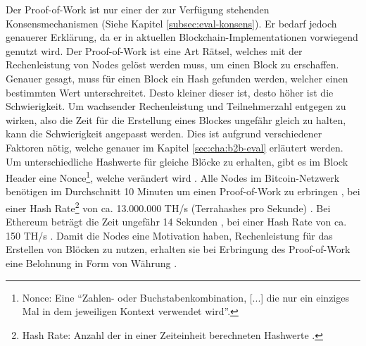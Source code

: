 Der Proof-of-Work ist nur einer der zur Verfügung stehenden Konsensmechanismen (Siehe Kapitel \ref{subsec:eval-konsens}). Er bedarf jedoch genauerer Erklärung, da er in aktuellen Blockchain-Implementationen vorwiegend genutzt wird. Der Proof-of-Work ist eine Art Rätsel, welches mit der Rechenleistung von Nodes gelöst werden muss, um einen Block zu erschaffen. Genauer gesagt, muss für einen Block ein Hash gefunden werden, welcher einen bestimmten Wert unterschreitet. Desto kleiner dieser ist, desto höher ist die Schwierigkeit. Um wachsender Rechenleistung und Teilnehmerzahl entgegen zu wirken, also die Zeit für die Erstellung eines Blockes ungefähr gleich zu halten, kann die Schwierigkeit angepasst werden. Dies ist aufgrund verschiedener Faktoren nötig, welche genauer im Kapitel \ref{sec:cha:b2b-eval} erläutert werden. Um unterschiedliche Hashwerte für gleiche Blöcke zu erhalten, gibt es im Block Header eine Nonce\footnote{Nonce: Eine ``Zahlen- oder Buchstabenkombination, [...] die nur ein einziges Mal in dem jeweiligen Kontext verwendet wird''\cite{Nonce2017}.}, welche verändert wird \cite{NakamotoBitcoinPeertoPeerElectronic2008}. Alle Nodes im Bitcoin-Netzwerk benötigen im Durchschnitt 10 Minuten um einen Proof-of-Work zu erbringen \cite{AntonopoulosMasteringbitcoin2015}, bei einer Hash Rate\footnote{Hash Rate: Anzahl der in einer Zeiteinheit berechneten Hashwerte \cite{GlossarBitcoin}.} von ca. 13.000.000 TH/s (Terrahashes pro Sekunde) \cite{HashRate}. Bei Ethereum beträgt die Zeit ungefähr 14 Sekunden \cite{EthereumAverageBlockTime}, bei einer Hash Rate von ca. 150 TH/s \cite{EthereumNetworkHashRate}. Damit die Nodes eine Motivation haben, Rechenleistung für das Erstellen von Blöcken zu nutzen, erhalten sie bei Erbringung des Proof-of-Work eine Belohnung in Form von Währung \cite{NakamotoBitcoinPeertoPeerElectronic2008} \cite{EthereumWhitepaper2017}. 

